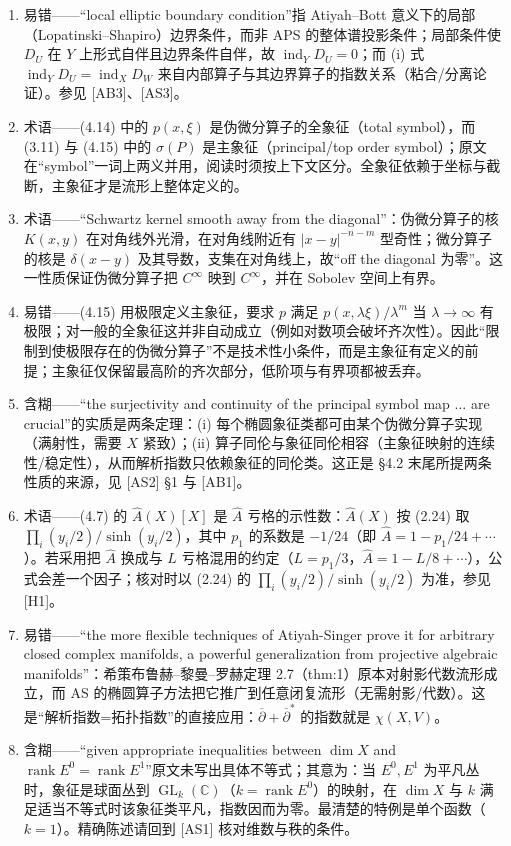 \documentclass[11pt]{amsart}
\theoremstyle{definition}
\theoremstyle{remark}
\theoremstyle{plain}
\numberwithin{equation}{section}
\renewcommand{\:}{\colon}
\newcommand{\Ahat}{{\hat A}}
\newcommand{\CC}{{\mathbb C}}
\newcommand{\dbar}{{\overline\partial}}
\DeclareMathOperator{\ind}{ind}
\DeclareMathOperator{\rank}{rank}
\DeclareMathOperator{\GL}{GL}
\begin{document}
\begin{enumerate}[leftmargin=2.2em,itemsep=2pt,topsep=2pt]
  \item 易错——“local elliptic boundary condition”指 Atiyah–Bott 意义下的局部（Lopatinski–Shapiro）边界条件，而非 APS 的整体谱投影条件；局部条件使 $D_U$ 在 $Y$ 上形式自伴且边界条件自伴，故 $\ind_YD_U=0$；而 (i) 式 $\ind_YD_U=\ind_XD_W$ 来自内部算子与其边界算子的指数关系（粘合/分离论证）。参见 [AB3]、[AS3]。
  \item 术语——(4.14) 中的 $p(x,\xi)$ 是伪微分算子的全象征（total symbol），而 (3.11) 与 (4.15) 中的 $\sigma(P)$ 是主象征（principal/top order symbol）；原文在“symbol”一词上两义并用，阅读时须按上下文区分。全象征依赖于坐标与截断，主象征才是流形上整体定义的。
  \item 术语——“Schwartz kernel smooth away from the diagonal”：伪微分算子的核 $K(x,y)$ 在对角线外光滑，在对角线附近有 $|x-y|^{-n-m}$ 型奇性；微分算子的核是 $\delta(x-y)$ 及其导数，支集在对角线上，故“off the diagonal 为零”。这一性质保证伪微分算子把 $C^\infty$ 映到 $C^\infty$，并在 Sobolev 空间上有界。
  \item 易错——(4.15) 用极限定义主象征，要求 $p$ 满足 $p(x,\lambda\xi)/\lambda^m$ 当 $\lambda\to\infty$ 有极限；对一般的全象征这并非自动成立（例如对数项会破坏齐次性）。因此“限制到使极限存在的伪微分算子”不是技术性小条件，而是主象征有定义的前提；主象征仅保留最高阶的齐次部分，低阶项与有界项都被丢弃。
  \item 含糊——“the surjectivity and continuity of the principal symbol map ... are crucial”的实质是两条定理：(i) 每个椭圆象征类都可由某个伪微分算子实现（满射性，需要 $X$ 紧致）；(ii) 算子同伦与象征同伦相容（主象征映射的连续性/稳定性），从而解析指数只依赖象征的同伦类。这正是 §4.2 末尾所提两条性质的来源，见 [AS2] §1 与 [AB1]。
  \item 术语——(4.7) 的 $\Ahat(X)[X]$ 是 $\Ahat$ 亏格的示性数：$\Ahat(X)$ 按 (2.24) 取 $\prod_i(y_i/2)/\sinh(y_i/2)$，其中 $p_1$ 的系数是 $-1/24$（即 $\Ahat=1-p_1/24+\cdots$）。若采用把 $\Ahat$ 换成与 $L$ 亏格混用的约定（$L=p_1/3$，$\Ahat=1-L/8+\cdots$），公式会差一个因子；核对时以 (2.24) 的 $\prod_i(y_i/2)/\sinh(y_i/2)$ 为准，参见 [H1]。
  \item 易错——“the more flexible techniques of Atiyah-Singer prove it for arbitrary closed complex manifolds, a powerful generalization from projective algebraic manifolds”：希策布鲁赫–黎曼–罗赫定理 2.7（thm:1）原本对射影代数流形成立，而 AS 的椭圆算子方法把它推广到任意闭复流形（无需射影/代数）。这是“解析指数=拓扑指数”的直接应用：$\dbar+\dbar^*$ 的指数就是 $\chi(X,V)$。
  \item 含糊——“given appropriate inequalities between $\dim X$ and $\rank E^0=\rank E^1$”原文未写出具体不等式；其意为：当 $E^0,E^1$ 为平凡丛时，象征是球面丛到 $\GL_k(\CC)$（$k=\rank E^0$）的映射，在 $\dim X$ 与 $k$ 满足适当不等式时该象征类平凡，指数因而为零。最清楚的特例是单个函数（$k=1$）。精确陈述请回到 [AS1] 核对维数与秩的条件。

\end{enumerate}
\end{document}
